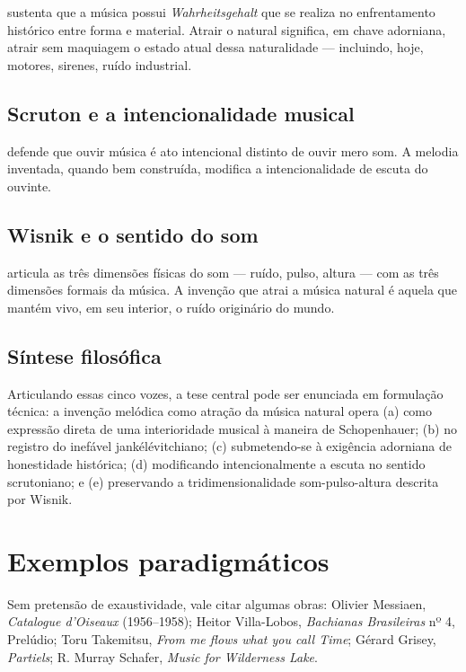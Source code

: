 \documentclass[12pt,a4paper]{article}
\begin{document}
\citet{Adorno2018} sustenta que a música possui \textit{Wahrheitsgehalt} que se realiza no enfrentamento histórico entre forma e material. Atrair o natural significa, em chave adorniana, atrair sem maquiagem o estado atual dessa naturalidade --- incluindo, hoje, motores, sirenes, ruído industrial.

\subsection{Scruton e a intencionalidade musical}

\citet{Scruton1997} defende que ouvir música é ato intencional distinto de ouvir mero som. A melodia inventada, quando bem construída, modifica a intencionalidade de escuta do ouvinte.

\subsection{Wisnik e o sentido do som}

\citet{Wisnik1989} articula as três dimensões físicas do som --- ruído, pulso, altura --- com as três dimensões formais da música. A invenção que atrai a música natural é aquela que mantém vivo, em seu interior, o ruído originário do mundo.

\subsection{Síntese filosófica}

Articulando essas cinco vozes, a tese central pode ser enunciada em formulação técnica: a invenção melódica como atração da música natural opera (a) como expressão direta de uma interioridade musical à maneira de Schopenhauer; (b) no registro do inefável jankélévitchiano; (c) submetendo-se à exigência adorniana de honestidade histórica; (d) modificando intencionalmente a escuta no sentido scrutoniano; e (e) preservando a tridimensionalidade som-pulso-altura descrita por Wisnik.

\section{Exemplos paradigmáticos}

Sem pretensão de exaustividade, vale citar algumas obras: Olivier Messiaen, \textit{Catalogue d'Oiseaux} (1956--1958); Heitor Villa-Lobos, \textit{Bachianas Brasileiras} nº 4, Prelúdio; Toru Takemitsu, \textit{From me flows what you call Time}; Gérard Grisey, \textit{Partiels}; R. Murray Schafer, \textit{Music for Wilderness Lake}.
\end{document}
